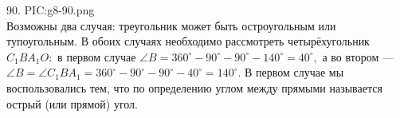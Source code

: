 90. {{PIC:g8-90.png}}\\
Возможны два случая: треугольник может быть остроугольным или тупоугольным. В обоих случаях необходимо рассмотреть четырёхугольник $C_1BA_1O:$ в первом случае $\angle B =360^\circ-90^\circ-90^\circ-140^\circ=40^\circ,$ а во втором --- $\angle B=\angle C_1BA_1=360^\circ-90^\circ-90^\circ-40^\circ=140^\circ.$ В первом случае мы воспользовались тем, что по определению углом между прямыми называется острый (или прямой) угол.\\
